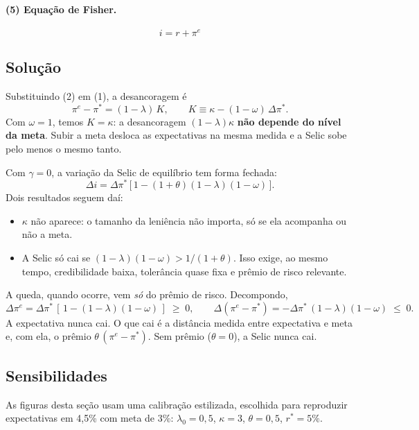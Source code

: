 \documentclass[11pt,a4paper]{article}
\newcommand{\pe}{\pi^{e}}
\newcommand{\meta}{\pi^{*}}
\newcommand{\dmeta}{\Delta\meta}
\begin{document}
\paragraph{(5) Equação de Fisher.}
\begin{equation}
i = r + \pe
\end{equation}

\subsection{Solução}

Substituindo (2) em (1), a desancoragem é
\begin{equation}
\pe - \meta = (1-\lambda)\,K, \qquad K \equiv \kappa - (1-\omega)\,\dmeta .
\end{equation}
Com $\omega=1$, temos $K=\kappa$: a desancoragem $(1-\lambda)\kappa$ \textbf{não depende do nível da meta}. Subir a meta desloca as expectativas na mesma medida e a Selic sobe pelo menos o mesmo tanto.

Com $\gamma=0$, a variação da Selic de equilíbrio tem forma fechada:
\begin{equation}
\Delta i = \dmeta\,\bigl[\,1 - (1+\theta)(1-\lambda)(1-\omega)\,\bigr].
\end{equation}
Dois resultados seguem daí:
\begin{itemize}
  \item $\kappa$ não aparece: o tamanho da leniência não importa, só se ela acompanha ou não a meta.
  \item A Selic só cai se $(1-\lambda)(1-\omega) > 1/(1+\theta)$. Isso exige, ao mesmo tempo, credibilidade baixa, tolerância quase fixa e prêmio de risco relevante.
\end{itemize}
A queda, quando ocorre, vem \emph{só} do prêmio de risco. Decompondo,
\begin{equation}
\Delta\pe = \dmeta\,[\,1-(1-\lambda)(1-\omega)\,] \;\geq\; 0, \qquad
\Delta(\pe-\meta) = -\dmeta\,(1-\lambda)(1-\omega) \;\leq\; 0 .
\end{equation}
A expectativa nunca cai. O que cai é a distância medida entre expectativa e meta e, com ela, o prêmio $\theta\,(\pe-\meta)$. Sem prêmio ($\theta=0$), a Selic nunca cai.

\subsection{Sensibilidades}

As figuras desta seção usam uma calibração estilizada, escolhida para reproduzir expectativas em 4,5\% com meta de 3\%: $\lambda_0=0{,}5$, $\kappa=3$, $\theta=0{,}5$, $r^{*}=5\%$.
\end{document}
